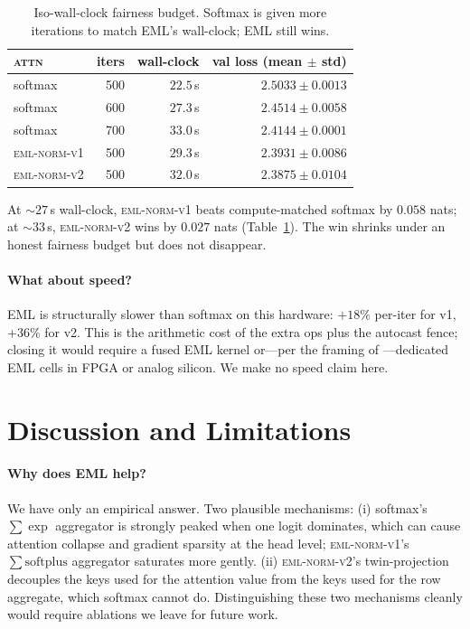 \documentclass{article}
\begin{document}
\begin{table}[t]
\centering
\caption{Iso-wall-clock fairness budget. Softmax is given more iterations
to match EML's wall-clock; EML still wins.}
\label{tab:isowall}
\begin{tabular}{lrrr}
\toprule
\textsc{attn} & iters & wall-clock & val loss (mean $\pm$ std) \\
\midrule
softmax              & 500 & $22.5$\,s & $2.5033 \pm 0.0013$ \\
softmax              & 600 & $27.3$\,s & $2.4514 \pm 0.0058$ \\
softmax              & 700 & $33.0$\,s & $2.4144 \pm 0.0001$ \\
\textsc{eml-norm-v1} & 500 & $29.3$\,s & $\mathbf{2.3931 \pm 0.0086}$ \\
\textsc{eml-norm-v2} & 500 & $32.0$\,s & $\mathbf{2.3875 \pm 0.0104}$ \\
\bottomrule
\end{tabular}
\end{table}

At $\sim$$27$\,s wall-clock, \textsc{eml-norm-v1} beats compute-matched
softmax by $0.058$ nats; at $\sim$$33$\,s, \textsc{eml-norm-v2} wins by
$0.027$ nats (Table~\ref{tab:isowall}). The win shrinks under an honest
fairness budget but does not disappear.

\paragraph{What about speed?} EML is structurally slower than softmax on
this hardware: $+18\%$ per-iter for v1, $+36\%$ for v2. This is the
arithmetic cost of the extra ops plus the autocast fence; closing it
would require a fused EML kernel or---per the framing of
\citet{odrzywolek2026hardware}---dedicated EML cells in FPGA or analog
silicon. We make no speed claim here.

\section{Discussion and Limitations}

\paragraph{Why does EML help?} We have only an empirical answer. Two
plausible mechanisms: (i) softmax's $\sum \exp$ aggregator is strongly
peaked when one logit dominates, which can cause attention collapse and
gradient sparsity at the head level; \textsc{eml-norm-v1}'s
$\sum \mathrm{softplus}$ aggregator saturates more gently. (ii)
\textsc{eml-norm-v2}'s twin-projection decouples the keys used for the
attention value from the keys used for the row aggregate, which softmax
cannot do. Distinguishing these two mechanisms cleanly would require
ablations we leave for future work.
\end{document}
